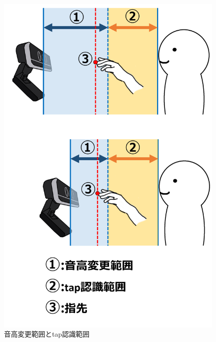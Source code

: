 \begin{figure}[t]
	\begin{center}
		\includegraphics[width=0.9\linewidth]{./pics/04/pitchi_range_change.png}
		\caption{音高変更範囲とtap認識範囲}
		\label{img:range}
	\end{center}
\end{figure}

